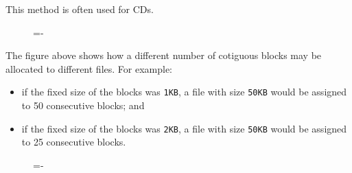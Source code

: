 \documentclass[a4paper]{systems-software}
\begin{document}
This method is often used for CDs.

\begin{figure}[H]
  \lineskip=-\fboxrule
\end{figure}

The figure above shows how a different number of cotiguous blocks may be allocated to different files. For example:
\begin{itemize}
	\item if the fixed size of the blocks was \texttt{1KB}, a file with size \texttt{50KB} would be assigned to 50 consecutive blocks; and
	\item if the fixed size of the blocks was \texttt{2KB}, a file with size \texttt{50KB} would be assigned to 25 consecutive blocks.
\end{itemize}

\begin{figure}[H]
  \lineskip=-\fboxrule
\end{figure}
\end{document}

